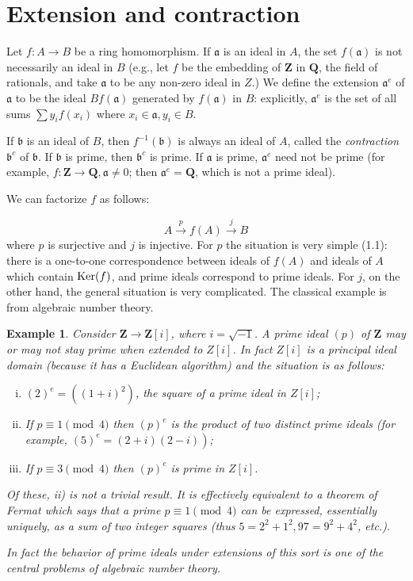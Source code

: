 \documentclass[class=book, crop=false]{standalone}
\newtheorem*{example}{Example}
\theoremstyle{definition}
\theoremstyle{remark}
\begin{document}
\section{Extension and contraction}
Let $f: A \to B$ be a ring homomorphism. If $\mathfrak{a}$ is an ideal in $A$,
the set $f(\mathfrak{a})$ is not necessarily an ideal in $B$ (e.g., let $f$ be
the embedding of $\mathbf{Z}$ in $\mathbf{Q}$, the field of rationals, and take
$\mathfrak{a}$ to be any non-zero ideal in $Z$.) We define the extension
$\mathfrak{a}^{e}$ of $\mathfrak{a}$ to be the ideal $B f(\mathfrak{a})$
generated by $f(\mathfrak{a})$ in $B$: explicitly, $\mathfrak{a}^{e}$ is the set
of all sums $\sum y_{i} f\left(x_{i}\right)$ where
$x_{i} \in \mathfrak{a}, y_{i} \in B$.

If $\mathfrak{b}$ is an ideal of $B$, then $f^{-1}(\mathfrak{b})$ is always an
ideal of $A$, called the \textit{contraction} $\mathfrak{b}^{c}$ of
$\mathfrak{b}$. If $\mathfrak{b}$ is prime, then $\mathfrak{b}^{c}$ is prime. If
$\mathfrak{a}$ is prime, $\mathfrak{a}^{e}$ need not be prime (for example,
$f: \mathbf{Z} \to \mathbf{Q}, \mathfrak{a} \neq 0$; then
$\mathfrak{a}^{e}=\mathbf{Q}$, which is not a prime ideal).

We can factorize $f$ as follows:

\[
  A \stackrel{p}{\to} f(A) \stackrel{j}{\to} B
\]
where $p$ is surjective and $j$ is injective. For $p$ the situation is very
simple (1.1): there is a one-to-one correspondence between ideals of $f(A)$ and
ideals of $A$ which contain $\operatorname{Ker}(f)$, and prime ideals correspond
to prime ideals. For $j$, on the other hand, the general situation is very
complicated. The classical example is from algebraic number theory.
\begin{example}
  Consider $\mathbf{Z} \to \mathbf{Z}[i]$, where $i=\sqrt{-1}$. A prime ideal
  $(p)$ of $\mathbf{Z}$ may or may not stay prime when extended to $Z[i]$. In
  fact $Z[i]$ is a principal ideal domain (because it has a Euclidean algorithm)
  and the situation is as follows:
  \begin{enumerate}[i)]
    \item $(2)^{e}=\left((1+i)^{2}\right)$, the \textit{square} of a prime ideal
          in $Z[i]$;
    \item If $p \equiv 1\pmod{4}$ then $(p)^{e}$ is the product of two distinct
          prime ideals (for example, $\left.(5)^{e}=(2+i)(2-i)\right)$;
    \item If $p \equiv 3\pmod{4}$ then $(p)^{e}$ is prime in $Z[i]$.
  \end{enumerate}
  Of these, ii) is not a trivial result. It is effectively equivalent to a
  theorem of Fermat which says that a prime $p \equiv 1\pmod{4}$ can be
  expressed, essentially uniquely, as a sum of two integer squares (thus
  $5=2^{2}+1^{2}, 97=9^{2}+4^{2}$, etc.).

  In fact the behavior of prime ideals under extensions of this sort is one of
  the central problems of algebraic number theory.
\end{example}
\end{document}
